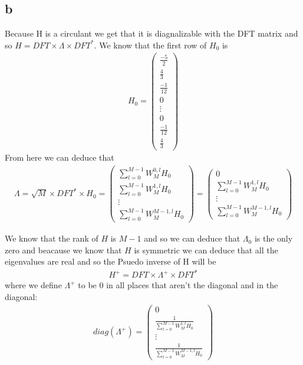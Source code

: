 \documentclass[a4paper]{article}
\begin{document}
\subsection*{b}
Because H is a circulant we get that it is diagnalizable with the DFT matrix and so $H = DFT \times \Lambda \times DFT^{*}$. We know that the first row of $H_{0}$ is
\begin{align}
    H_{0} = \begin{pmatrix} \frac{-5}{2} \\ \frac{4}{3} \\ \frac{-1}{12} \\ 0 \\ \vdots \\0 \\ \frac{-1}{12} \\ \frac{4}{3}
    \end{pmatrix}
\end{align}
From here we can deduce that
\begin{align}
    \Lambda = \sqrt{M} \times DFT^{*} \times H_{0} = \begin{pmatrix}
        \sum_{l=0}^{M-1}W_{M}^{0,l}H_{0} \\ \sum_{l=0}^{M-1}W_{M}^{1,l}H_{0} \\ \vdots \\
        \sum_{l=0}^{M-1}W_{M}^{M-1,l}H_{0}
    \end{pmatrix} = \begin{pmatrix}
        0 \\ \sum_{l=0}^{M-1}W_{M}^{1,l}H_{0} \\ \vdots \\
        \sum_{l=0}^{M-1}W_{M}^{M-1,l}H_{0}
    \end{pmatrix}
\end{align}

We know that the rank of $H$ is $M-1$ and so we can deduce that $\Lambda_{0}$ is the only zero and beacause we know that $H$ is symmetric we can deduce that all the eigenvalues  are real and so the Psuedo inverse of H will be 
\begin{align}
    H^{+} = DFT \times \Lambda^{+} \times DFT^{*}
\end{align}
where we define $\Lambda^{+}$ to be 0 in all places that aren't the diagonal and in the diagonal:
\begin{align}
    diag(\Lambda^{+}) = \begin{pmatrix}
        0 \\ \frac{1}{\sum_{l=0}^{M-1}W_{M}^{1,l}H_{0}} \\ \vdots \\
        \frac{1}{\sum_{l=0}^{M-1}W_{M}^{M-1,l}H_{0}} \end{pmatrix}
\end{align}
\end{document}
